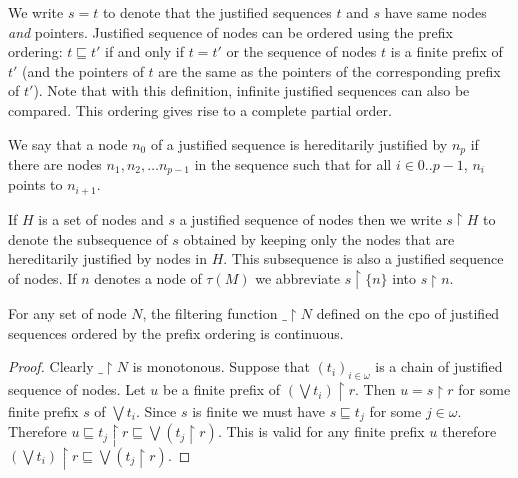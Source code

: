 We write $s = t$ to denote that the justified sequences $t$ and $s$
have same nodes \emph{and} pointers. Justified sequence of nodes can
be ordered using the prefix ordering: $t \sqsubseteq t'$ if and only
if $t=t'$ or the sequence of nodes $t$ is a finite prefix of $t'$
(and the pointers of $t$ are the same as the pointers of the
corresponding prefix of $t'$). Note that with this definition,
infinite justified sequences can also be compared. This ordering
gives rise to a complete partial order.

We say that a node $n_0$ of a justified sequence is hereditarily justified by $n_p$ if there are nodes $n_1, n_2, \ldots n_{p-1}$ in
the sequence such that for all $i\in 0..p-1$, $n_i$ points to $n_{i+1}$.

If $H$ is a set of nodes and $s$ a justified sequence of nodes then we write $s \upharpoonright H$ to denote the subsequence of $s$ obtained by keeping only the nodes that are hereditarily justified by nodes in $H$. This subsequence is also a justified
sequence of nodes. If $n$ denotes a node of $\tau(M)$ we abbreviate $s \upharpoonright \{ n \}$ into $ s\upharpoonright n$.

\begin{lem}
\label{lem:filtercontinous}
For any set of node $N$, the filtering function $\_ \upharpoonright N$ defined on the cpo of justified sequences ordered by the prefix ordering
is continuous.
\end{lem}
\begin{proof}
Clearly $\_ \upharpoonright N$ is monotonous.
Suppose that $(t_i)_{i\in\omega}$ is a chain of justified sequence of nodes. Let $u$ be a finite prefix of $(\bigvee t_i) \upharpoonright r$.
Then $u = s \upharpoonright r$ for some finite prefix $s$ of $\bigvee t_i$. Since $s$ is finite we must have $s \sqsubseteq t_j$ for some $j\in\omega$.
Therefore $u \sqsubseteq t_j \upharpoonright r \sqsubseteq \bigvee (t_j \upharpoonright r)$.
This is valid for any finite prefix $u$ therefore $(\bigvee t_i) \upharpoonright r \sqsubseteq \bigvee (t_j \upharpoonright r)$.
\end{proof}


